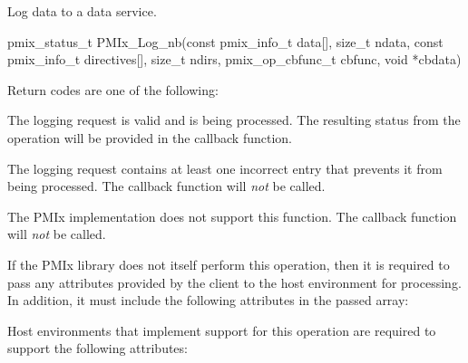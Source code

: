 \summary

Log data to a data service.

\format

\cspecificstart
\begin{codepar}
pmix_status_t
PMIx_Log_nb(const pmix_info_t data[], size_t ndata,
            const pmix_info_t directives[], size_t ndirs,
            pmix_op_cbfunc_t cbfunc, void *cbdata)
\end{codepar}
\cspecificend

\begin{arglist}
\end{arglist}

Return codes are one of the following:

\begin{constantdesc}
\item {} The logging request is valid and is being processed. The resulting status from the operation will be provided in the callback function.
\item {} The logging request contains at least one incorrect entry that prevents it from being processed. The callback function will \emph{not} be called.
\item {} The \ac{PMIx} implementation does not support this function. The callback function will \emph{not} be called.
\end{constantdesc}

\reqattrstart
If the \ac{PMIx} library does not itself perform this operation, then it is required to pass any attributes provided by the client to the host environment for processing. In addition, it must include the following attributes in the passed  array:


Host environments that implement support for this operation are required to support the following attributes:


